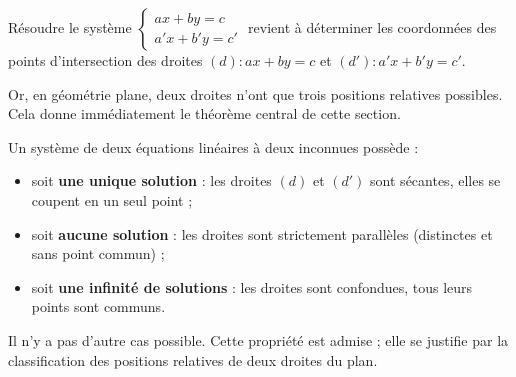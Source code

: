 \documentclass[11pt]{article}
\newcommand{\cle}[1]{{\popxbold\color{popdark}#1}}
\begin{document}
\begin{aretenir}
Résoudre le système $\begin{cases} ax + by = c \\ a'x + b'y = c' \end{cases}$ revient à déterminer les coordonnées des points d'intersection des droites $(d) : ax + by = c$ et $(d') : a'x + b'y = c'$.
\end{aretenir}

Or, en géométrie plane, deux droites n'ont que trois positions relatives possibles. Cela donne immédiatement le théorème central de cette section.

\begin{propriete}
Un système de deux équations linéaires à deux inconnues possède :
\begin{itemize}
\item soit \textbf{une unique solution} : les droites $(d)$ et $(d')$ sont \cle{sécantes}, elles se coupent en un seul point ;
\item soit \textbf{aucune solution} : les droites sont \cle{strictement parallèles} (distinctes et sans point commun) ;
\item soit \textbf{une infinité de solutions} : les droites sont \cle{confondues}, tous leurs points sont communs.
\end{itemize}
Il n'y a pas d'autre cas possible. Cette propriété est admise ; elle se justifie par la classification des positions relatives de deux droites du plan.
\end{propriete}
\end{document}
